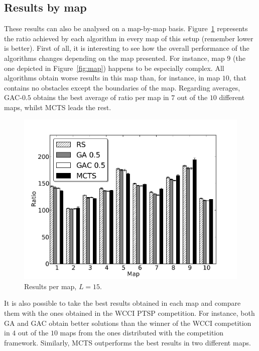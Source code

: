 \documentclass{sig-alternate}
\begin{document}
\subsection{Results by map} \label{sec:byMap}

These results can also be analysed on a map-by-map basis. Figure~\ref{fig:bars10} represents the ratio achieved by each algorithm in every map of this setup (remember lower is better). First of all, it is interesting to see how the overall performance of the algorithms changes depending on the map presented. For instance, map $9$ (the one depicted in Figure~\ref{fig:map}) happens to be especially complex. All algorithms obtain worse results in this map than, for instance, in map $10$, that contains no obstacles except the boundaries of the map. Regarding averages, GAC-$0.5$ obtains the best average of ratio per map in $7$ out of the $10$ different maps, whilst MCTS leads the rest.

\begin{figure} [!t]
	\begin{center}
	\includegraphics[width=0.75\columnwidth,natwidth=1021,natheight=765]{img/barsFinal10.png}
	\caption{Results per map, $L = 15$.}
	\label{fig:bars10}
	\end{center}
\end{figure}	

It is also possible to take the best results obtained in each map and compare them with the ones obtained in the WCCI PTSP competition. For instance, both GA and GAC obtain better solutions than the winner of the WCCI competition in $4$ out of the $10$ maps from the ones distributed with the competition framework. Similarly, MCTS outperforms the best results in two different maps.
\end{document}
